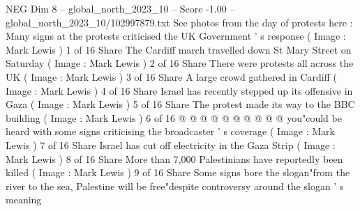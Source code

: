 \begin{textsample}{NEG Dim 8 – global\_north\_2023\_10 – Score -1.00 – global\_north\_2023\_10/102997879.txt}
See photos from the day of protests here : Many signs at the protests criticised the UK Government ' s response ( Image : Mark Lewis ) 1 of 16 Share The Cardiff march travelled down St Mary Street on Saturday ( Image : Mark Lewis ) 2 of 16 Share There were protests all across the UK ( Image : Mark Lewis ) 3 of 16 Share A large crowd gathered in Cardiff ( Image : Mark Lewis ) 4 of 16 Share Israel has recently stepped up its offensive in Gaza ( Image : Mark Lewis ) 5 of 16 Share The protest made its way to the BBC building ( Image : Mark Lewis ) 6 of 16 @ @ @ @ @ @ @ @ @ @ you"could be heard with some signs criticising the broadcaster ' s coverage ( Image : Mark Lewis ) 7 of 16 Share Israel has cut off electricity in the Gaza Strip ( Image : Mark Lewis ) 8 of 16 Share More than 7,000 Palestinians have reportedly been killed ( Image : Mark Lewis ) 9 of 16 Share Some signs bore the slogan"from the river to the sea, Palestine will be free"despite controversy around the slogan ' s meaning

\end{textsample}
